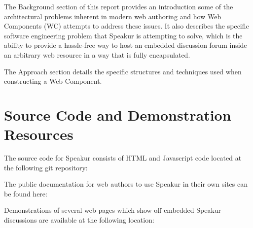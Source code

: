 The Background section of this report provides an introduction some of the architectural problems inherent in modern web authoring and how Web Components (WC) attempts to address these issues.
It also describes the specific software engineering problem that Speakur is attempting to solve, which is the ability to provide a hassle-free way to host an embedded discussion forum inside an arbitrary web resource in a way that is fully encapsulated.

The Approach section details the specific structures and techniques used when constructing a Web Component. 


\section{Source Code and Demonstration Resources}
%

The source code for Speakur consists of HTML and Javascript code located at the following git repository:

The public documentation for web authors to use Speakur in their own sites can be found here:

Demonstrations of several web pages which show off embedded Speakur discussions are available at the following location:

